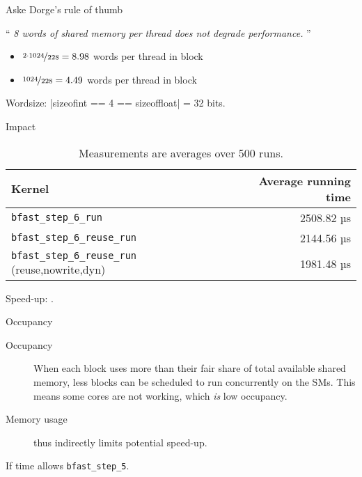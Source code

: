 \begin{frame}[fragile]{Aske Dorge's rule of thumb}

\footnotesize \enquote{
    \textit{
       8 words of shared memory per thread does not degrade performance. 
    }
}
\pause

\begin{itemize}
    \item \(\nicefrac{2\cdot 1024}{228} = 8.98\) words per thread in block
    \item \(\nicefrac{1024}{228} = 4.49\) words per thread in block
\end{itemize}

\pause
Wordsize: |sizeof{int} == 4 == sizeof{float}| = 32 bits.


\end{frame}

\begin{frame}[fragile]{Impact}

    \begin{table}
        \centering
        \begin{tabular}{l r}
            \textbf{Kernel} & \textbf{Average running time} \\ \hline
          \footnotesize  \texttt{bfast\_step\_6\_run} &    2508.82  µs \\
          \footnotesize   \texttt{bfast\_step\_6\_reuse\_run}  & 2144.56  µs \\
          \footnotesize \texttt{bfast\_step\_6\_reuse\_run} (reuse,nowrite,dyn) &  1981.48 µs
        \end{tabular}
        \caption{Measurements are averages over 500 runs.}
       \label{tab:noreuse}
    \end{table}

    \pause

    Speed-up:  \times.
        
    

\end{frame}



\begin{frame}[fragile]{Occupancy}

    \begin{description}
        \item [Occupancy] When each block uses more than their fair share of
            total available shared memory, less blocks can be scheduled to run
            concurrently on the SMs. This means some cores are not working, which \textit{is} low occupancy.
        \item [Memory usage] thus indirectly limits potential speed-up.
    \end{description}


    \pause

    If time allows \texttt{bfast\_step\_5}.
\end{frame}



